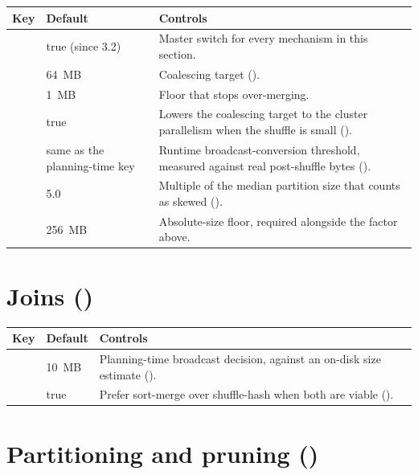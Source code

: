\begin{longtable}{@{}P{6.6cm}P{2.3cm}P{5.7cm}@{}}
\toprule
\textbf{Key} & \textbf{Default} & \textbf{Controls} \\
\midrule
\endhead
{} & true (since 3.2) & Master switch for
  every mechanism in this section. \\
 & 64~MB &
  Coalescing target (). \\
 & 1~MB &
  Floor that stops over-merging. \\
 & true &
  Lowers the coalescing target to the cluster parallelism when the shuffle is small
  (). \\
 & same as the
  planning-time key & Runtime broadcast-conversion threshold, measured
  against real post-shuffle bytes (). \\
 & 5.0 & Multiple of
  the median partition size that counts as skewed
  (). \\
 & 256~MB &
  Absolute-size floor, required alongside the factor above. \\
\bottomrule
\end{longtable}

\section{Joins ()}

\begin{longtable}{@{}P{6.6cm}P{2.3cm}P{5.7cm}@{}}
\toprule
\textbf{Key} & \textbf{Default} & \textbf{Controls} \\
\midrule
\endhead
{} & 10~MB & Planning-time broadcast
  decision, against an on-disk size estimate (). \\
 & true & Prefer sort-merge over
  shuffle-hash when both are viable (). \\
\bottomrule
\end{longtable}

\section{Partitioning and pruning ()}

